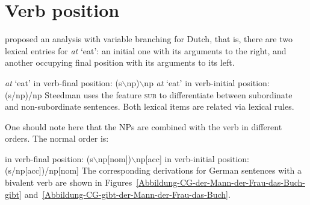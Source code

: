 \section{Verb position}
\label{sec-Verbstellung-CG-Steedman}

\mbox{}\citet[]{Steedman2000a-u} proposed an analysis with variable branching for Dutch, that is, there are two lexical entries for 
 \emph{at} `eat': an initial one with its arguments to the right, and another occupying final position with its arguments to its left.

\eal
\ex \emph{at} `eat' in verb-final position: (s$\backslash$np)$\backslash$np
\ex \emph{at} `eat' in verb-initial position: (s/np)/np
\zl
Steedman uses the feature \textsc{sub} to differentiate between subordinate and non-subordinate sentences. Both lexical items are related via lexical rules.

One should note here that the NPs are combined with the verb in different orders. The normal order is:

\eal
\label{CG-Verbbewegung}
\ex in verb-final position: (s$\backslash$np[nom])$\backslash$np[acc]
\ex in verb-initial position: (s/np[acc])/np[nom]
\zl
The corresponding derivations for German sentences with a bivalent verb are shown in Figures~\ref{Abbildung-CG-der-Mann-der-Frau-das-Buch-gibt}
and~\ref{Abbildung-CG-gibt-der-Mann-der-Frau-das-Buch}.

